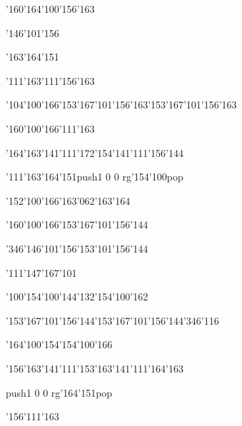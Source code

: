 \null\vfill\ipa\centerline{\enskip\enskip\enskip\enskip\enskip\enskip\enskip\enskip\char'160\char'164\char'100\char'156\char'163}\medskip\centerline{\enskip\enskip\enskip\char'146\char'101\char'156\enskip\enskip\enskip\enskip\enskip\enskip\enskip\enskip}\medskip\centerline{\enskip\enskip\enskip\char'163\char'164\char'151\enskip\enskip\enskip\enskip\enskip\enskip}\medskip\centerline{\enskip\char'111\char'163\enskip\char'111\char'156\char'163\enskip\enskip\enskip\enskip\enskip\enskip\enskip}\medskip\centerline{\enskip\char'104\char'100\char'166\enskip\char'153\char'167\char'101\char'156\char'163\enskip\char'153\char'167\char'101\char'156\char'163\enskip\enskip\enskip}\medskip\centerline{\enskip\enskip\enskip\char'160\char'100\char'166\enskip\enskip\enskip\enskip\enskip\enskip\enskip\enskip\enskip\char'111\char'163}\medskip\centerline{\enskip\char'164\char'163\char'141\char'111\char'172\enskip\enskip\enskip\enskip\char'154\char'141\char'111\char'156\char'144\enskip\enskip\enskip}\medskip\centerline{\enskip\char'111\enskip\char'163\char'164\char'151\enskip\pdfcolorstack\match push{1 0 0 rg}\char'154\char'100\pdfcolorstack\match pop{}\enskip\enskip\enskip}\medskip\centerline{\enskip\enskip\enskip\enskip\enskip\enskip\enskip\char'152\char'100\char'166\enskip\char'163\char'062\char'163\char'164}\medskip\vfill\footline{\hfil\tt\folio\hfil}\eject
\null\vfill\ipa\centerline{\enskip\enskip\enskip\enskip\char'160\char'100\char'166\enskip\char'153\char'167\char'101\char'156\char'144}\medskip\centerline{\enskip\char'346\enskip\char'146\char'101\char'156\enskip\char'153\char'101\char'156\char'144\enskip\enskip\enskip}\medskip\centerline{\enskip\char'111\enskip\char'147\char'167\char'101\enskip\enskip\enskip\enskip\enskip\enskip}\medskip\centerline{\enskip\char'100\char'154\enskip\char'100\char'144\char'132\enskip\enskip\enskip\enskip\char'154\char'100\char'162}\medskip\centerline{\enskip\enskip\enskip\enskip\enskip\char'153\char'167\char'101\char'156\char'144\enskip\char'153\char'167\char'101\char'156\char'144\enskip\char'346\char'116}\medskip\centerline{\enskip\enskip\enskip\char'164\char'100\char'154\enskip\char'154\char'100\char'166\enskip\enskip\enskip\enskip\enskip\enskip\enskip}\medskip\centerline{\enskip\char'156\char'163\char'141\char'111\char'153\enskip\enskip\enskip\enskip\char'163\char'141\char'111\char'164\char'163\enskip\enskip\enskip}\medskip\centerline{\enskip\enskip\enskip\enskip\enskip\enskip\enskip\enskip\enskip\enskip\pdfcolorstack\match push{1 0 0 rg}\char'164\char'151\pdfcolorstack\match pop{}}\medskip\centerline{\enskip\enskip\enskip\enskip\enskip\enskip\enskip\char'156\char'111\char'163\enskip\enskip\enskip\enskip\enskip}\medskip\vfill\footline{\hfil\tt\folio\hfil}\eject
